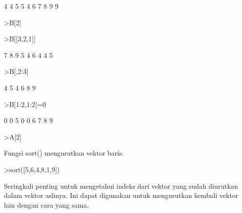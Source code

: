 \documentclass[a4paper,10pt]{article}
\begin{document}
\begin{eulernotebook}
\begin{eulercomment}
\begin{eulercomment}
\begin{eulercomment}
\begin{eulercomment}
\begin{eulercomment}
\begin{eulercomment}
\begin{eulercomment}
\begin{eulercomment}
\begin{euleroutput}
              4             4             5 
              5             4             6 
              7             8             9 
  9
\end{euleroutput}
\begin{eulerprompt}
>B[2]
\end{eulerprompt}
\begin{euleroutput}
  [5,  4,  6]
\end{euleroutput}
\begin{eulerprompt}
>B[[3,2,1]]
\end{eulerprompt}
\begin{euleroutput}
              7             8             9 
              5             4             6 
              4             4             5 
\end{euleroutput}
\begin{eulerprompt}
>B[,2:3]
\end{eulerprompt}
\begin{euleroutput}
              4             5 
              4             6 
              8             9 
\end{euleroutput}
\begin{eulerprompt}
>B[1:2,1:2]=0
\end{eulerprompt}
\begin{euleroutput}
              0             0             5 
              0             0             6 
              7             8             9 
\end{euleroutput}
\begin{eulerprompt}
>A[2]
\end{eulerprompt}
\begin{euleroutput}
  [0,  0,  6]
\end{euleroutput}
\begin{eulercomment}
Fungsi sort() mengurutkan vektor baris.
\end{eulercomment}
\begin{eulerprompt}
>sort([5,6,4,8,1,9])
\end{eulerprompt}
\begin{euleroutput}
  [1,  4,  5,  6,  8,  9]
\end{euleroutput}
\begin{eulercomment}
Seringkali penting untuk mengetahui indeks dari vektor yang sudah
diurutkan dalam vektor aslinya. Ini dapat digunakan untuk mengurutkan
kembali vektor lain dengan cara yang sama.


\end{eulercomment}
\end{eulercomment}
\end{eulercomment}
\end{eulercomment}
\end{eulercomment}
\end{eulercomment}
\end{eulercomment}
\end{eulercomment}
\end{eulercomment}
\end{eulernotebook}
\end{document}
